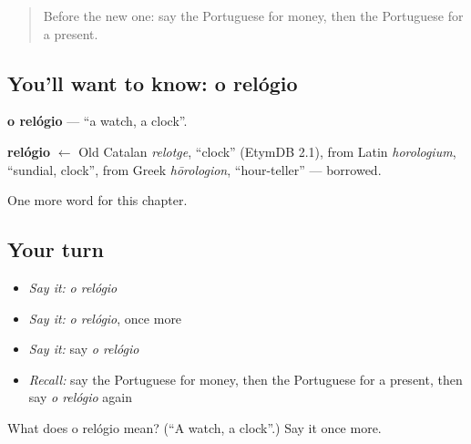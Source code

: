 \label{lesson:PT-C53-relogio}



\begin{quote}
Before the new one: say the Portuguese for money, then the Portuguese for a present.
\end{quote}

\subsection*{You'll want to know: o relógio}
\textbf{o relógio} — \textquotedblleft{}a watch, a clock\textquotedblright{}.

\begin{cousinweb}
\textbf{relógio} $\leftarrow$ Old Catalan \emph{relotge}, \textquotedblleft{}clock\textquotedblright{} (EtymDB 2.1), from Latin \emph{horologium}, \textquotedblleft{}sundial, clock\textquotedblright{}, from Greek \emph{hōrologion}, \textquotedblleft{}hour-teller\textquotedblright{} — borrowed.
\end{cousinweb}

\begin{grammarlens}[title={What you've built}]
One more word for this chapter.
\end{grammarlens}

\subsection*{Your turn}
\begin{itemize}
\raggedright
  \item \emph{Say it:} \emph{o relógio}
  \item \emph{Say it:} \emph{o relógio}, once more
  \item \emph{Say it:} say \emph{o relógio}
  \item \emph{Recall:} say the Portuguese for money, then the Portuguese for a present, then say \emph{o relógio} again
\end{itemize}

\begin{tcolorbox}[breakable,colback=teal!4,colframe=teal!35!black,title={Before you move on}]
What does o relógio mean? (\textquotedblleft{}A watch, a clock\textquotedblright{}.) Say it once more.
\end{tcolorbox}
